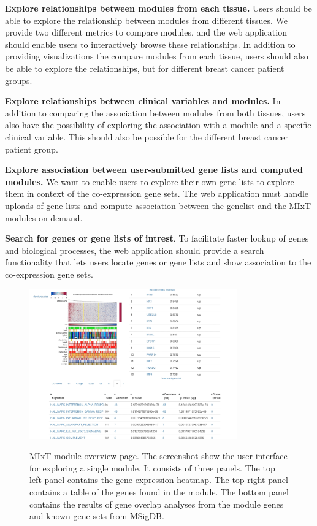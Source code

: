 \textbf{Explore relationships between modules from each tissue.} Users should be
able to explore the relationship between modules from different tissues. We
provide two different metrics to compare modules, and the web application should
enable users to interactively browse these relationships. In addition to
providing visualizations the compare modules from each tissue, users should also
be able to explore the relationships, but for different breast cancer patient
groups. 

\textbf{Explore relationships between clinical variables and modules.} In
addition to comparing the association between modules from both tissues, users
also have the possibility of exploring the association with a module and a
specific clinical variable. This should also be possible for the different
breast cancer patient group. 

\textbf{Explore association between user-submitted gene lists and computed
modules.} We want to enable users to explore their own gene lists to explore
them in context of
the co-expression gene sets. The web application must handle uploads of gene
lists and compute association between the genelist and the MIxT modules on
demand. 

\textbf{Search for genes or gene lists of intrest}. To facilitate faster lookup
of genes and biological processes, the web application should provide a search
functionality that lets users locate genes or gene lists and show association to
the co-expression gene sets. 


\begin{figure}[h!]
\centering
\caption{MIxT module overview page. The screenshot show the user interface for
exploring a single module. It consists of three panels. The top left panel
contains the gene expression heatmap. The top right panel contains a table of
the genes found in the module. The bottom panel contains the results of gene
overlap analyses from the module genes and known gene sets from MSigDB.}
\includegraphics[width=0.8\textwidth]{figures/module.png}
\label{fig_first_case}
\end{figure} 

